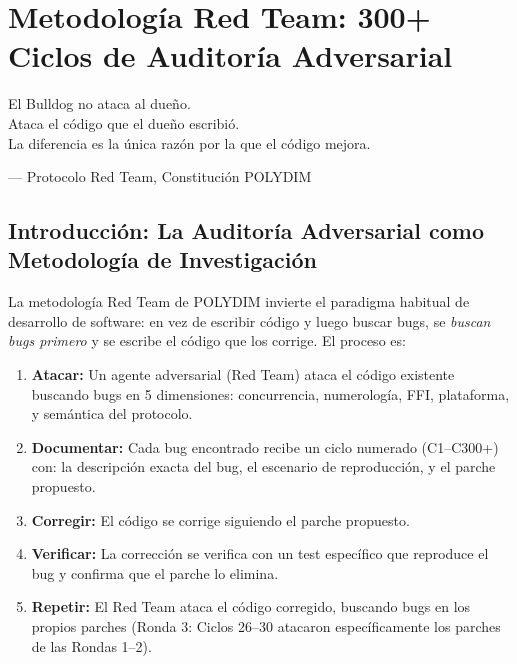 \chapter{Metodología Red Team: 300+ Ciclos de Auditoría Adversarial}
\label{ch:red_team}

\epigraph{El Bulldog no ataca al dueño.\\
Ataca el código que el dueño escribió.\\
La diferencia es la única razón por la que el código mejora.}{--- Protocolo Red Team, Constitución POLYDIM}

\section{Introducción: La Auditoría Adversarial como Metodología de Investigación}

La metodología Red Team de POLYDIM invierte el paradigma habitual de desarrollo de software:
en vez de escribir código y luego buscar bugs, se \textit{buscan bugs primero} y se
escribe el código que los corrige. El proceso es:

\begin{enumerate}
\item \textbf{Atacar:} Un agente adversarial (Red Team) ataca el código existente buscando
bugs en 5 dimensiones: concurrencia, numerología, FFI, plataforma, y semántica del protocolo.

\item \textbf{Documentar:} Cada bug encontrado recibe un ciclo numerado (C1--C300+) con:
la descripción exacta del bug, el escenario de reproducción, y el parche propuesto.

\item \textbf{Corregir:} El código se corrige siguiendo el parche propuesto.

\item \textbf{Verificar:} La corrección se verifica con un test específico que reproduce
el bug y confirma que el parche lo elimina.

\item \textbf{Repetir:} El Red Team ataca el código corregido, buscando bugs en los
propios parches (Ronda 3: Ciclos 26--30 atacaron específicamente los parches de las
Rondas 1--2).
\end{enumerate}

